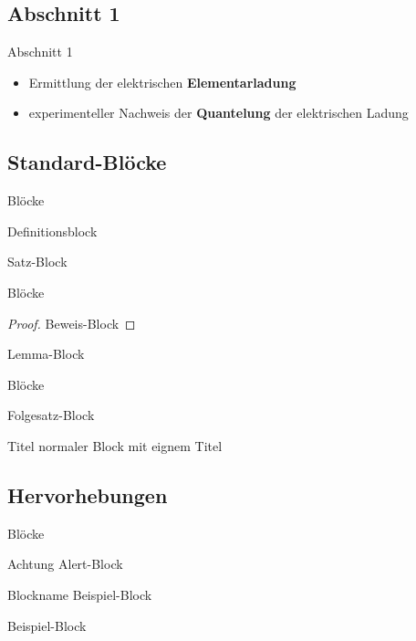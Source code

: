 \subsection{Abschnitt 1}
\begin{frame}[t]{Abschnitt 1}
    \begin{itemize}
        \item Ermittlung der elektrischen \textbf{Elementarladung} 
        \item experimenteller Nachweis der \textbf{Quantelung} der elektrischen Ladung
    \end{itemize}
\end{frame}

\subsection{Standard-Blöcke}
\begin{frame}{Blöcke}
    \begin{definition}
        Definitionsblock
    \end{definition}
    \pause
    \vspace{1em}
    \begin{theorem}
        Satz-Block
    \end{theorem}
\end{frame}

\begin{frame}{Blöcke}
    \begin{proof}
        Beweis-Block
    \end{proof}
    \vspace{1em}
    \begin{lemma}
        Lemma-Block
    \end{lemma}
\end{frame}

\begin{frame}{Blöcke}
    \begin{corollary}
        Folgesatz-Block
    \end{corollary}
    \vspace{1em}
    \begin{block}{Titel}
        normaler Block mit eignem Titel
    \end{block}
\end{frame}

\subsection{Hervorhebungen}
\begin{frame}{Blöcke}
    \begin{alertblock}{Achtung}
        Alert-Block
    \end{alertblock}
    \begin{exampleblock}{Blockname}
        Beispiel-Block
    \end{exampleblock}
    \begin{example}
        Beispiel-Block
    \end{example}
\end{frame}

